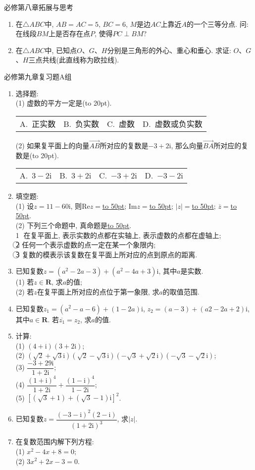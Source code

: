 \documentclass[10pt,a4paper]{article}
\newcommand{\blank}[1]{\underline{\hbox to #1pt{}}}
\newcommand{\bracket}[1]{(\hbox to #1pt{})}
\newcommand{\fourch}[4]{\par\begin{tabular}{p{.23\textwidth}p{.23\textwidth}p{.23\textwidth}p{.23\textwidth}}
A.~#1 &B.~#2& C.~#3& D.~#4
\end{tabular}}
\begin{document}
必修第八章拓展与思考

\begin{enumerate}
\item 在$\triangle ABC$中, $AB=AC=5$, $BC=6$, $M$是边$AC$上靠近$A$的一个三等分点. 问: 在线段$BM$上是否存在点$P$, 使得$PC\perp BM$?
\item 在$\triangle ABC$中, 已知点$O$、$G$、$H$分别是三角形的外心、重心和垂心. 求证: $O$、$G$、$H$三点共线(此直线称为欧拉线).
\end{enumerate}

必修第九章复习题A组

\begin{enumerate}[1.]
\item 选择题:\\
(1) 虚数的平方一定是\bracket{20}.
\fourch{正实数}{负实数}{虚数}{虚数或负实数}
(2) 如果复平面上的向量$\overrightarrow{AB}$所对应的复数是$-3+2\mathrm{i}$, 那么向量$\overrightarrow{BA}$所对应的复数是\bracket{20}.
\fourch{$3-2\mathrm{i}$}{$3+2\mathrm{i}$}{$-3+2\mathrm{i}$}{$-3-2\mathrm{i}$}
\item 填空题:\\
(1) 设$z=11-60\mathrm{i}$, 则$\mathrm{Re}z=$\blank{50}; $\mathrm{Im}z=$\blank{50}; $|z|=$\blank{50}; $\overline{z}=$\blank{50}.\\
(2) 下列三个命题中, 真命题是\blank{50}.\\
\textcircled{1} 在复平面上, 表示实数的点都在实轴上, 表示虚数的点都在虚轴上;\\
\textcircled{2} 任何一个表示虚数的点一定在某一个象限内;\\
\textcircled{3} 复数的模表示该复数在复平面上所对应的点到原点的距离.
\item 已知复数$z=(a^2-2a-3)+(a^2-4a+3)\mathrm{i}$, 其中$a$是实数.\\
(1) 若$z\in \mathbf{R}$, 求$a$的值;\\
(2) 若$z$在复平面上所对应的点位于第一象限, 求$a$的取值范围.
\item 已知复数$z_1=(a^2-a-6)+(1-2a)\mathrm{i}$, $z_2=(a-3)+(a2-2a+2)\mathrm{i}$, 其中$a\in \mathbf{R}$.
若$\overline{z_1}=z_2$, 求$a$的值.
\item 计算:\\
(1) $(4+\mathrm{i})(3+2\mathrm{i})$;\\
(2) $(\sqrt 2+\sqrt 3\mathrm{i})(\sqrt 2-\sqrt 3\mathrm{i})(-\sqrt 3+\sqrt 2\mathrm{i})(-\sqrt 3-\sqrt 2\mathrm{i})$;\\
(3) $\dfrac{-3+29\mathrm{i}}{1+2\mathrm{i}}$;\\
(4) $\dfrac{(1+\mathrm{i})^4}{1+2\mathrm{i}}+\dfrac{(1-\mathrm{i})^4}{1-2\mathrm{i}}$;\\
(5) $[(\sqrt 3+1)+(\sqrt 3-1)\mathrm{i}]^2$.
\item 已知复数$z=\dfrac{(-3-\mathrm{\mathrm{i}})^2(2-\mathrm{\mathrm{i}})}{(1+2\mathrm{i})^3}$, 求$|z|$.
\item 在复数范围内解下列方程:\\
(1) $x^2-4x+8=0$;\\
(2) $3x^2+2x-3=0$.
\end{enumerate}
\end{document}
